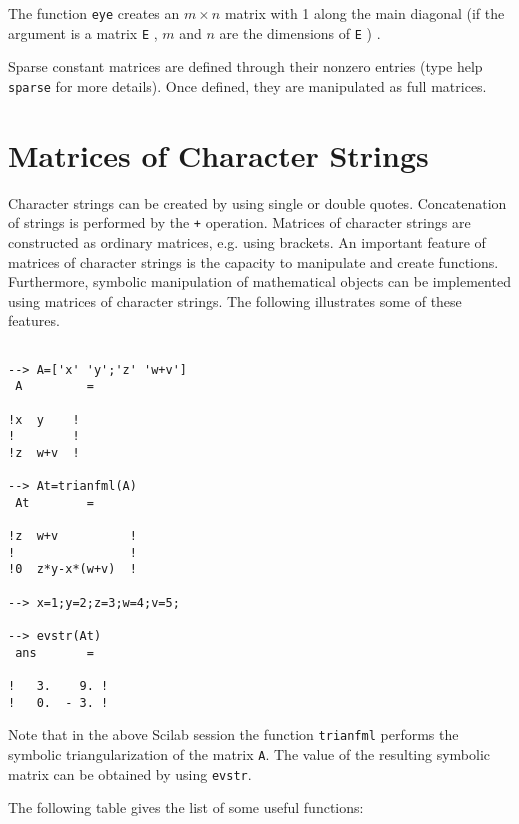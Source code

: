 The function {\tt eye} creates an $m\times n$ matrix with 1 along the main
diagonal (if the argument is a matrix {\tt E} , $m$ and $n$ are the 
dimensions of {\tt E} ) .

Sparse constant matrices are defined through their nonzero entries 
(type help {\tt sparse} for more details). Once defined, they are
manipulated as full matrices.


\section{Matrices of Character Strings}
\label{s2.3}

Character strings can be created by using single or double quotes.
Concatenation of strings is performed by the {\tt +} operation.
Matrices of character strings are constructed as ordinary matrices,
e.g. using brackets.  An important feature of matrices of
character strings is the capacity to manipulate and create functions.
Furthermore, symbolic manipulation of mathematical objects can be
implemented using matrices of character strings.  The following
illustrates some of these features.
\begin{verbatim}
 
--> A=['x' 'y';'z' 'w+v']
 A         =
 
!x  y    !
!        !
!z  w+v  !
 
--> At=trianfml(A)
 At        =
 
!z  w+v          !
!                !
!0  z*y-x*(w+v)  !
 
--> x=1;y=2;z=3;w=4;v=5;
 
--> evstr(At)
 ans       =
 
!   3.    9. !
!   0.  - 3. !

\end{verbatim}
Note that in the above Scilab session the function 
{\tt trianfml}
performs the symbolic triangularization of the matrix {\tt A}.
The value of the resulting symbolic matrix can be obtained by
using {\tt evstr}.

The following table gives the list of some useful functions:

